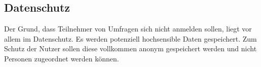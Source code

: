\subsection{Datenschutz}
Der Grund, dass Teilnehmer von Umfragen sich nicht anmelden sollen, liegt vor allem im Datenschutz.
Es werden potenziell hochsensible Daten gespeichert.
Zum Schutz der Nutzer sollen diese vollkommen anonym gespeichert werden und nicht Personen zugeordnet werden können.





